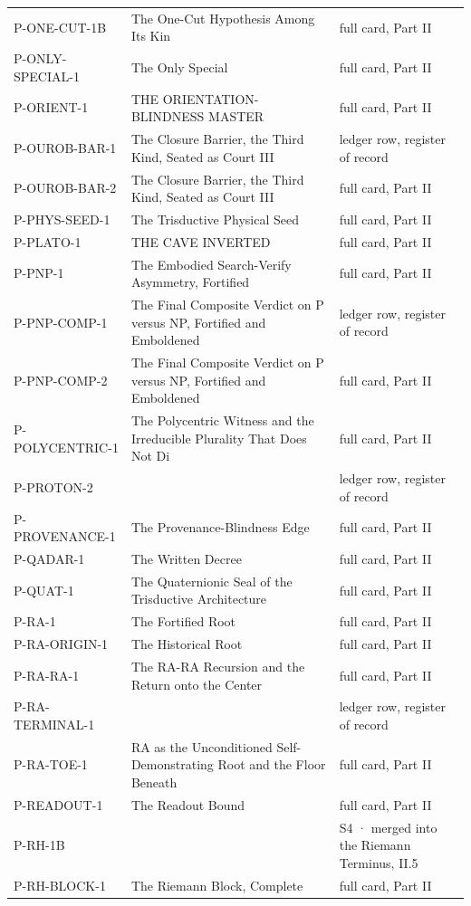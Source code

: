 \documentclass[10pt,twocolumn]{article}
\begin{document}
\begin{center}
\begin{longtable}{>{\raggedright\arraybackslash}p{}>{\raggedright\arraybackslash}p{}>{\raggedright\arraybackslash}p{}}
P-ONE-CUT-1B & The One-Cut Hypothesis Among Its Kin & full card, Part II \\
P-ONLY-SPECIAL-1 & The Only Special & full card, Part II \\
P-ORIENT-1 & THE ORIENTATION-BLINDNESS MASTER & full card, Part II \\
P-OUROB-BAR-1 & The Closure Barrier, the Third Kind, Seated as Court III & ledger row, register of record \\
P-OUROB-BAR-2 & The Closure Barrier, the Third Kind, Seated as Court III & full card, Part II \\
P-PHYS-SEED-1 & The Trisductive Physical Seed & full card, Part II \\
P-PLATO-1 & THE CAVE INVERTED & full card, Part II \\
P-PNP-1 & The Embodied Search-Verify Asymmetry, Fortified & full card, Part II \\
P-PNP-COMP-1 & The Final Composite Verdict on P versus NP, Fortified and Emboldened & ledger row, register of record \\
P-PNP-COMP-2 & The Final Composite Verdict on P versus NP, Fortified and Emboldened & full card, Part II \\
P-POLYCENTRIC-1 & The Polycentric Witness and the Irreducible Plurality That Does Not Di & full card, Part II \\
P-PROTON-2 &  & ledger row, register of record \\
P-PROVENANCE-1 & The Provenance-Blindness Edge & full card, Part II \\
P-QADAR-1 & The Written Decree & full card, Part II \\
P-QUAT-1 & The Quaternionic Seal of the Trisductive Architecture & full card, Part II \\
P-RA-1 & The Fortified Root & full card, Part II \\
P-RA-ORIGIN-1 & The Historical Root & full card, Part II \\
P-RA-RA-1 & The RA-RA Recursion and the Return onto the Center & full card, Part II \\
P-RA-TERMINAL-1 &  & ledger row, register of record \\
P-RA-TOE-1 & RA as the Unconditioned Self-Demonstrating Root and the Floor Beneath & full card, Part II \\
P-READOUT-1 & The Readout Bound & full card, Part II \\
P-RH-1B &  & S4 · merged into the Riemann Terminus, II.5 \\
P-RH-BLOCK-1 & The Riemann Block, Complete & full card, Part II \\

\end{longtable}
\end{center}
\end{document}
